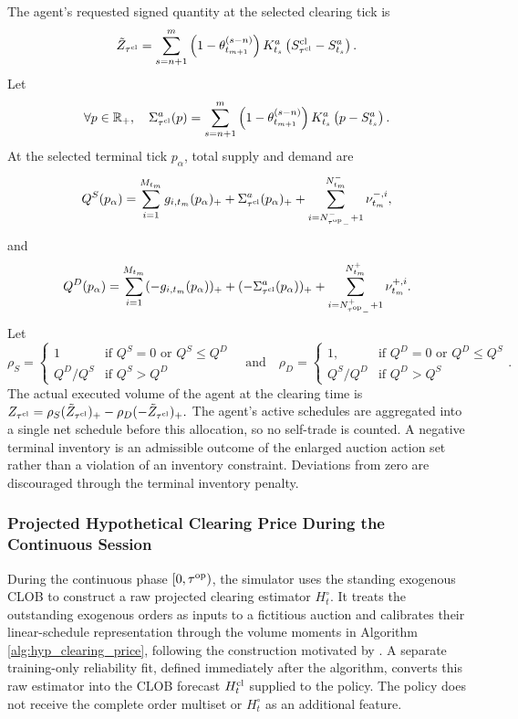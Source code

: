 \documentclass[11pt]{article}
\begin{document}
\endgroup\vspace{0.5em}

{The agent's requested signed quantity at the selected clearing tick is}
\[\tilde Z_{ \tau^{\mathrm{cl}}} = \sum_{s= n+1}^{m}\left(1-\theta_{t_{m+1}}^{(s-n)}\right)
K_{t_s}^a\left(S_{\tau^{\mathrm{cl}}}^{\mathrm{cl}} - S_{t_s}^a\right).\]
Let
\[\forall p \in \mathbb{R}_+,\quad \Sigma_{\tau^{\mathrm{cl}}}^a(p) = \sum_{s= n+1}^{m}\left(1-\theta_{t_{m+1}}^{(s-n)}\right)
K_{t_s}^a\left(p - S_{t_s}^a\right).\]
At the {selected terminal tick} $p_\alpha$, total
supply and demand are
\[
Q^S(p_\alpha) = \sum_{i=1}^{M_{t_m}}g_{i,t_m}(p_\alpha)_+ + \Sigma_{\tau^{\mathrm{cl}}}^a(p_\alpha)_+ + \sum_{i={N_{{\tau^{\mathrm{op}}}_-}^-+1}}^{N_{t_m}^-}\nu_{t_m}^{-,i},\]
and
\[
Q^D(p_\alpha) = \sum_{i=1}^{M_{t_m}}(-g_{i,t_m}(p_\alpha))_+ + (-\Sigma_{\tau^{\mathrm{cl}}}^a(p_\alpha))_+ + \sum_{i={N_{{\tau^{\mathrm{op}}}_-}^++1}}^{N_{t_m}^+}\nu_{t_m}^{+,i}. \]
Let
\[ \rho_S = \left\{\begin{array}{ll} 1 & \text{if }Q^S=0\text{ or }Q^S\leq Q^D\\ Q^D/Q^S & \text{if }Q^S>Q^D \end{array}\right. \quad \text{and} \quad \rho_D = \left\{ \begin{array}{ll} 1, & \text{if }Q^D=0\text{ or }Q^D\leq Q^S\\ Q^S/Q^D & \text{if }Q^D>Q^S \end{array}\right..\]
The actual executed volume of the agent at the clearing time is $Z_{\tau^{\mathrm{cl}}} = \rho_S(\tilde Z_{\tau^{\mathrm{cl}}})_+ - \rho_D(-\tilde Z_{\tau^{\mathrm{cl}}})_+.$ The agent's active schedules are aggregated into a single net schedule before this allocation, so no self-trade is counted. A negative terminal inventory is an admissible outcome of the enlarged auction action set rather than a violation of an inventory constraint. Deviations from zero are discouraged through the terminal inventory penalty.

\subsubsection{Projected Hypothetical Clearing Price During the Continuous Session}\label{sec:proj}

{During the continuous phase $[0,\tau^{\mathrm{op}})$, the simulator uses the standing exogenous CLOB to construct a raw projected clearing estimator $H_t^\circ$. It treats the outstanding exogenous orders as inputs to a fictitious auction and calibrates their linear-schedule representation through the volume moments in Algorithm \ref{alg:hyp_clearing_price}, following the construction motivated by \cite{paul2021optimal}. A separate training-only reliability fit, defined immediately after the algorithm, converts this raw estimator into the CLOB forecast $H_t^{\mathrm{cl}}$ supplied to the policy. The policy does not receive the complete order multiset or $H_t^\circ$ as an additional feature.}\vspace{0.5em}
\end{document}
